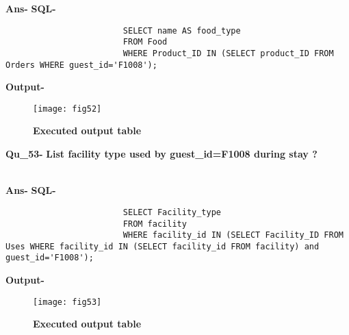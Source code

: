\documentclass[a4,12pt]{report}
\begin{document}
\textbf{Ans-}		\textbf{SQL-}
\begin{lstlisting}
						SELECT name AS food_type 
						FROM Food 
						WHERE Product_ID IN (SELECT product_ID FROM Orders WHERE guest_id='F1008'); 
\end{lstlisting}
\textbf{Output-} \\			   
\begin{figure}[hbtp]
\centering
\texttt{[image: fig52]}
\caption{\textbf{{\color{red}Executed output table}}}
\end{figure}

\textbf{Qu\_53-}  \textbf{List facility type used by guest\_id=F1008 during stay  ?} \\\

\textbf{Ans-}		\textbf{SQL-}
\begin{lstlisting}
						SELECT Facility_type 
						FROM facility 
						WHERE facility_id IN (SELECT Facility_ID FROM Uses WHERE facility_id IN (SELECT facility_id FROM facility) and guest_id='F1008'); 
\end{lstlisting}
\textbf{Output-} \\			   
\begin{figure}[hbtp]
\centering
\texttt{[image: fig53]}
\caption{\textbf{{\color{red}Executed output table}}}
\end{figure}
\end{document}
